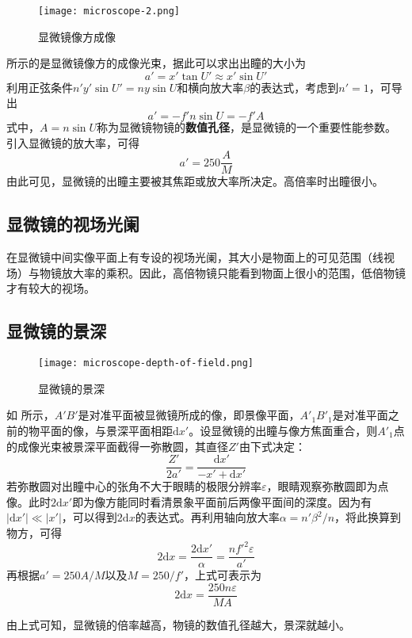 \begin{figure}[htbp]
	\centering
	\texttt{[image: microscope-2.png]}
	\caption{显微镜像方成像}
	\label{fig:microscope-2}
\end{figure}

 所示的是显微镜像方的成像光束，据此可以求出出瞳的大小为
\begin{equation}
a'=x'\tan U'\approx x'\sin U'
\end{equation}
利用正弦条件$n'y'\sin U'=ny\sin U$和横向放大率$\beta$的表达式，考虑到$n'=1$，可导出
\begin{equation}
a'=-f'n\sin U=-f'A
\end{equation}
式中，$A=n\sin U$称为显微镜物镜的\textbf{数值孔径}，是显微镜的一个重要性能参数。引入显微镜的放大率，可得
\begin{equation}
a'=250\frac{A}{M}
\end{equation}
由此可见，显微镜的出瞳主要被其焦距或放大率所决定。高倍率时出瞳很小。

\subsection{显微镜的视场光阑}
在显微镜中间实像平面上有专设的视场光阑，其大小是物面上的可见范围（线视场）与物镜放大率的乘积。因此，高倍物镜只能看到物面上很小的范围，低倍物镜才有较大的视场。

\subsection{显微镜的景深}

\begin{figure}[htbp]
	\centering
	\texttt{[image: microscope-depth-of-field.png]}
	\caption{显微镜的景深}
	\label{fig:microscope-depth-of-field}
\end{figure}

如 所示，$A'B'$是对准平面被显微镜所成的像，即景像平面，$A'_1B'_1$是对准平面之前的物平面的像，与景深平面相距$\mathrm{d}x'$。设显微镜的出瞳与像方焦面重合，则$A'_1$点的成像光束被景深平面截得一弥散圆，其直径$Z'$由下式决定：
\begin{equation}
\frac{Z'}{2a'}=\frac{\mathrm{d}x'}{-x'+\mathrm{d}x'}
\end{equation}
若弥散圆对出瞳中心的张角不大于眼睛的极限分辨率$\varepsilon$，眼睛观察弥散圆即为点像。此时$2\mathrm{d}x'$即为像方能同时看清景象平面前后两像平面间的深度。因为有$|\mathrm{d}x'|\ll|x'|$，可以得到$2\mathrm{d}x$的表达式。再利用轴向放大率$\alpha=n'\beta^2/n$，将此换算到物方，可得
\begin{equation}
2\mathrm{d}x=\frac{2\mathrm{d}x'}{\alpha}=\frac{nf'^2\varepsilon}{a'}
\end{equation}
再根据$a'=250A/M$以及$M=250/f'$，上式可表示为
\begin{equation}
2\mathrm{d}x=\frac{250n\varepsilon}{MA}
\end{equation}
\begin{property}
由上式可知，显微镜的倍率越高，物镜的数值孔径越大，景深就越小。
\end{property}

